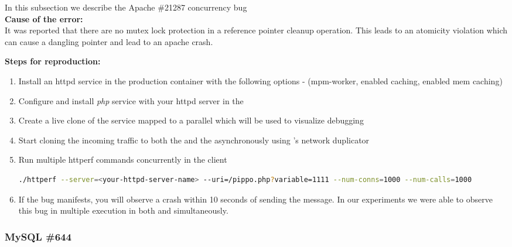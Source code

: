 In this subsection we describe the Apache \#21287 concurrency bug \\

\noindent \textbf{Cause of the error:} \\

It was reported that there are no mutex lock protection in a reference pointer cleanup operation. 
This leads to an atomicity violation which can cause a dangling pointer and lead to an apache crash.

\noindent \textbf{Steps for reproduction:} \\

\begin{adjustwidth}{0.5cm}{}
	\begin{enumerate}
		\item Install an httpd service in the production container with the following options - (mpm-worker, enabled caching, enabled mem caching)
		\item Configure and install \emph{php} service with your httpd server in the \productioncontainer
		\item Create a live clone of the service mapped to a parallel \debugcontainer which will be used to visualize debugging
		\item Start cloning the incoming traffic to both the \productioncontainer and the \debugcontainer asynchronously using \parikshan's network duplicator
		
		\item Run multiple httperf commands concurrently in the client
		
		\begin{lstlisting}[language=sh]
		   ./httperf --server=<your-httpd-server-name> --uri=/pippo.php?variable=1111 --num-conns=1000 --num-calls=1000
		\end{lstlisting}
		
		\item If the bug manifests, you will observe a crash within 10 seconds of sending the message. In our experiments we were able to observe this bug in multiple execution in both \productioncontainer and \debugcontainer simultaneously.
		
	\end{enumerate}
\end{adjustwidth}


\subsubsection{MySQL \#644}

